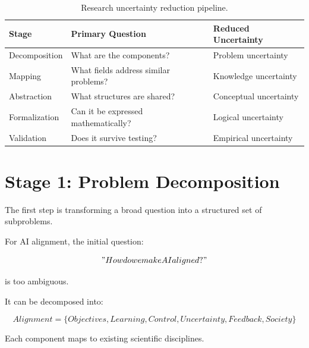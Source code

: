 \documentclass[11pt]{article}
\begin{document}
\begin{table}[h]

\centering

\begin{tabular}{lll}

\toprule

Stage & Primary Question & Reduced Uncertainty \\

\midrule

Decomposition
& What are the components?
& Problem uncertainty
\\

Mapping
& What fields address similar problems?
& Knowledge uncertainty
\\

Abstraction
& What structures are shared?
& Conceptual uncertainty
\\

Formalization
& Can it be expressed mathematically?
& Logical uncertainty
\\

Validation
& Does it survive testing?
& Empirical uncertainty
\\

\bottomrule

\end{tabular}

\caption{
Research uncertainty reduction pipeline.
}

\end{table}



\section{Stage 1: Problem Decomposition}


The first step is transforming a broad question into a structured set of
subproblems.


For AI alignment, the initial question:


\[
"How do we make AI aligned?"
\]


is too ambiguous.


It can be decomposed into:


\[
Alignment
=
\{
Objectives,
Learning,
Control,
Uncertainty,
Feedback,
Society
\}
\]


Each component maps to existing scientific disciplines.
\end{document}
